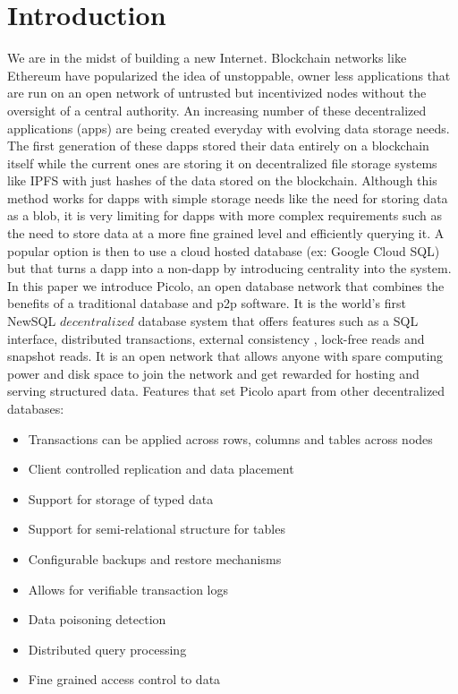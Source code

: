 \documentclass[preprint,10pt]{elsarticle}
\theoremstyle{definition}
\begin{document}
\section{Introduction}\label{Sect:Introduction}
We are in the midst of building a new Internet. Blockchain networks like Ethereum have popularized the idea of unstoppable, owner less applications that are run on an open network of untrusted but incentivized nodes without the oversight of a central authority. An increasing number of these decentralized applications (\DJ apps) are being created everyday with evolving data storage needs. The first generation of these dapps stored their data entirely on a blockchain itself while the current ones are storing it on decentralized file storage systems like IPFS with just hashes of the data stored on the blockchain. Although this method works for dapps with simple storage needs like the need for storing data as a blob, it is very limiting for dapps with more complex requirements such as the need to store data at a more fine grained level and efficiently querying it. A popular option is then to use a cloud hosted database (ex: Google Cloud SQL) but that turns a dapp into a non-dapp by introducing centrality into the system. \newline\newline
In this paper we introduce \textsf{Picolo}, an open database network that combines the benefits of a traditional database and p2p software. It is the world's first NewSQL $decentralized$ database system that offers features such as a SQL interface, distributed transactions, external consistency \cite{External_Consistency}, lock-free reads and snapshot reads. It is an open network that allows anyone with spare computing power and disk space to join the network and get rewarded for hosting and serving structured data.
\newline\newline
Features that set \textsf{Picolo} apart from other decentralized databases:
\begin{itemize}
	\item Transactions can be applied across rows, columns and tables across nodes
	\item Client controlled replication and data placement
	\item Support for storage of typed data
	\item Support for semi-relational structure for tables
	\item Configurable backups and restore mechanisms
	\item Allows for verifiable transaction logs
	\item Data poisoning detection
	\item Distributed query processing
	\item Fine grained access control to data
	\newline
\end{itemize}
\end{document}
